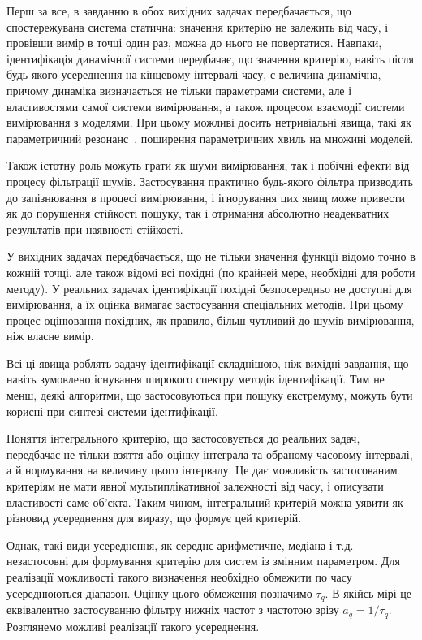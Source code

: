 Перш за все, в завданню в обох вихідних задачах передбачається, що
спостережувана система статична: значення критерію не залежить від часу, і
провівши вимір в точці один раз, можна до нього не повертатися. Навпаки,
ідентифікація динамічної системи передбачає, що значення критерію, навіть після
будь-якого усереднення на кінцевому інтервалі часу, є величина динамічна,
причому динаміка визначається не тільки параметрами системи, але і
властивостями самої системи вимірювання, а також процесом взаємодії системи
вимірювання з моделями. При цьому можливі досить нетривіальні явища, такі як
параметричний резонанс~\cite{landau1}, поширення параметричних хвиль на множині моделей.

Також істотну роль можуть грати як шуми вимірювання, так і
побічні ефекти від процесу фільтрації шумів. Застосування
практично будь-якого фільтра призводить до запізнювання в
процесі вимірювання, і ігнорування цих явищ може привести
як до порушення стійкості пошуку, так і отримання абсолютно
неадекватних результатів при наявності стійкості.

У вихідних задачах передбачається, що не тільки значення
функції відомо точно в кожній точці, але також відомі всі
похідні (по крайней мере, необхідні для роботи методу). У реальних
задачах ідентифікації похідні безпосередньо не доступні для
вимірювання, а їх оцінка вимагає застосування спеціальних
методів. При цьому процес оцінювання похідних, як правило,
більш чутливий до шумів вимірювання, ніж власне вимір.



Всі ці явища роблять задачу ідентифікації складнішою, ніж
вихідні завдання, що навіть зумовлено існування широкого
спектру методів ідентифікації. Тим не менш, деякі алгоритми,
що застосовуються при пошуку екстремуму, можуть бути корисні
при синтезі системи ідентифікації.


Поняття інтегрального критерію, що застосовується до реальних задач, передбачає
не тільки взяття або оцінку інтеграла та обраному часовому
інтервалі, а й нормування на величину цього інтервалу. Це дає можливість
застосованим критеріям не мати явної мультиплікативної залежності від часу, і
описувати властивості саме об'єкта. Таким чином, інтегральний критерій можна
уявити як різновид усереднення для виразу, що формує цей критерій.

Однак, такі види усереднення, як середнє арифметичне, медіана і
т.д. незастосовні для формування критерію для систем із змінним
параметром. Для реалізації можливості такого визначення
необхідно обмежити по часу усереднюються діапазон. Оцінку
цього обмеження позначимо
\label{atu:d:tau_q}$\tau_q$.
В якійсь мірі це еквівалентно застосуванню фільтру нижніх
частот з частотою зрізу
\label{atu:d:a_q}$a_q = 1 / \tau_q$.
Розглянемо можливі реалізації такого усереднення.

